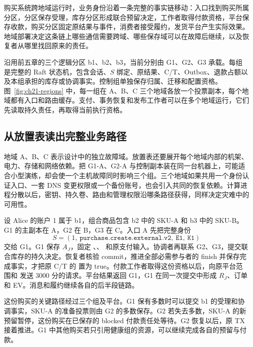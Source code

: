 购买系统跨地域运行时，业务身份沿着一条完整的事实链移动：入口找到购买所属分区，分区保存受理，库存分区形成联合预留决定，工作者取得付款资格，平台保存收款，购买分区固定原结果与事件，消费者接受履约，发货平台产生实际效果。地域部署决定这条链上哪些通信需要跨域、哪些保存域可以在故障后继续，以及恢复者从哪里找回原来的责任。

沿用前五章的三个逻辑分区 b1、b2、b3，当前分别由 G1、G2、G3 承载。每组是完整的 Raft 状态机，包含会话、$S$ 绑定、原结果、C/T、Outbox、退款占额以及本组承担的库存或协调事实。控制组单独保存归属、迁移和配置资格。图~\ref{fig:ch21-regions} 中，每一组在 A、B、C 三个地域各放一个投票副本，每个地域都有入口和路由缓存。支付、事务恢复和发布工作者可以在多个地域运行，它们先读取持久责任，再取得当前执行资格。


\subsection{从放置表读出完整业务路径}

地域 A、B、C 表示设计中的独立故障域。放置表还要展开每个地域内部的机架、电力、存储和网络依赖。把 G1-A、G2-A 与控制副本装在同一台机器上，可能适合小型演练，却会使一个主机故障同时影响三个组。三个地域如果共用一个身份认证入口、一套 DNS 变更权限或一个备份账号，也会引入共同的恢复依赖。计算进程分散以后，密钥、持久卷、路由和管理权限沿哪条路径获得，同样决定灾难中的可用性。

设 Alice 的账户 1 属于 b1，组合商品包含 b2 中的 SKU-A 和 b3 中的 SKU-B。G1 的主副本在 A，G2 在 B，G3 在 C。入口 A 先把完整身份
\[
S=(1,\ \texttt{purchase.create.external.v2},\ \texttt{E1},\ \texttt{K1})
\]
交给 G1。G1 保存 $A_J$，固定 、、 和原支付输入。协调者再联系 G2、G3，提交联合库存的持久决定。恢复者核验 commit，推进全部必需参与者的 finish 并保存完成事实，才把原 C/T 的  置为 true。付款工作者取得这份资格以后，向原平台范围和  发送 3000 分的请求。平台结果返回 G1，G1 在同一次提交中形成 $R_J$、订单和 EV。消息和履约继续各自的后半段链路。

这份购买的关键路径经过三个组及平台。G1 保有多数时可以提交 b1 的受理和协调事实，SKU-A 的准备投票则由 G2 的多数保存。G2 若失去多数，SKU-A 的新预留暂停，这份购买在已保存的 blocked 付款责任处等待。G2 恢复以后，原 TX 接着推进。G1 中其他购买若只引用健康组的资源，可以继续完成各自的预留与付款。


